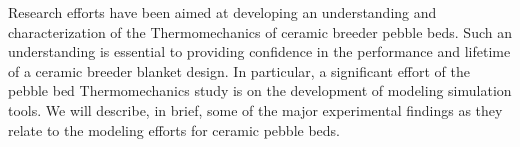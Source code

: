 




Research efforts have been aimed at developing an understanding and characterization of the Thermomechanics of ceramic breeder pebble beds. Such an understanding is essential to providing confidence in the performance and lifetime of a ceramic breeder blanket design. In particular, a significant effort of the pebble bed Thermomechanics study is on the development of modeling simulation tools. We will describe, in brief, some of the major experimental findings as they relate to the modeling efforts for ceramic pebble beds.


